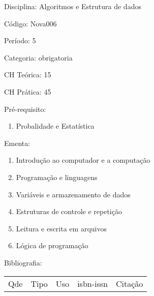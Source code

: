 \documentclass[12pt,a4paper,twoside]{report}
\begin{document}
Disciplina: Algoritmos e Estrutura de dados

Código: Nova006

Período: 5

Categoria: obrigatoria

CH Teórica: 15

CH Prática: 45




Pré-requisito:
\begin{enumerate}
\item Probalidade e Estatística
\end{enumerate}

Ementa:
\begin{enumerate}
\item Introdução ao computador e a computação
\item Programação e linguagens
\item Variáveis e armazenamento de dados
\item Estruturas de controle e repetição
\item Leitura e escrita em arquivos
\item Lógica de programação
\end{enumerate}



Bibliografia:


\begin{tabular}{llllp{8cm}}
Qde & Tipo & Uso & isbn-issn & Citação \\
\end{tabular}
\end{document}
